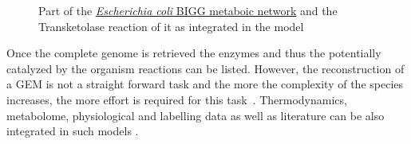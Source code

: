       \begin{figure}
         \hspace*{-1.75in}

         \caption[Part of the \textit{Escherichia coli} metaboic network and the Transketolase reaction]{
            Part of the \href{http://bigg.ucsd.edu/static/models/e_coli_core.xml}{\textit{Escherichia coli} BIGG metaboic network}  
            and the Transketolase reaction of it as integrated in the model}
         \label{fig:met_net}
      \end{figure}


      Once the complete genome is retrieved the enzymes and thus the potentially  
      catalyzed by the organism reactions can be listed. 
      However, the reconstruction of a GEM is not a straight forward task 
      and the more the complexity of the species increases, 
      the more effort is required for this task~\citep{thiele2010protocol}. 
      Thermodynamics, metabolome, physiological 
      and labelling data as well as literature can be also integrated in such models \citep{saldida2020unbiased}. 

